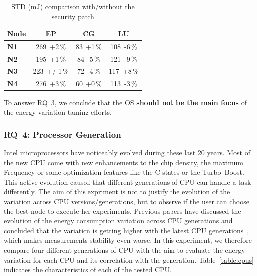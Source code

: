 \begin{table}[h!]
    \centering
    \caption{STD (mJ) comparison with/without the security patch}
    \label{table:meltdown}
    \small
    \begin{tabular}{|l|c|c|c|}
        \hline
        \textbf{Node} & \textbf{\sf EP} & \textbf{\sf CG} & \textbf{\sf LU} \\
        \hline
        \hline
        \textbf{N1}   & 269~+2\,\%      & 83~+1\,\%       & 108~-6\,\%      \\
        \hline
        \textbf{N2}   & 195~+1\,\%      & 84~-5\,\%       & 121~-9\,\%      \\
        \hline
        \textbf{N3}   & 223~+/-1\,\%    & 72~-4\,\%       & 117~+8\,\%      \\
        \hline
        \textbf{N4}   & 276~+3\,\%      & 60~+0\,\%       & 113~-3\,\%      \\
        \hline
    \end{tabular}
\end{table}

\begin{mdframed}[skipabove=\topsep,skipbelow=\topsep]
    To answer \textsc{RQ~3}, we conclude that the OS \textbf{should not be the main focus} of the energy variation taming efforts.
\end{mdframed}

\subsubsection{\textsc{RQ}~4: Processor Generation}
Intel microprocessors have noticeably evolved during these last 20 years.
Most of the new CPU come with new enhancements to the chip density, the maximum Frequency or some optimization features like the C-states or the Turbo~Boost.
This active evolution caused that different generations of CPU can handle a task differently.
The aim of this expriment is not to justify the evolution of the variation across CPU versions/generations, but to observe if the user can choose the best node to execute her experiments.
Previous papers have discussed the evolution of the energy consumption variation across CPU generations and concluded that the variation is getting higher with the latest CPU generations~\cite{wang_experimental_nodate,marathe_empirical_2017_m}, which makes measurements stability even worse.
In this experiment, we therefore compare four different generations of CPU with the aim to evaluate the energy variation for each CPU and its correlation with the generation.
Table~\ref{table:cpus} indicates the characteristics of each of the tested CPU.

